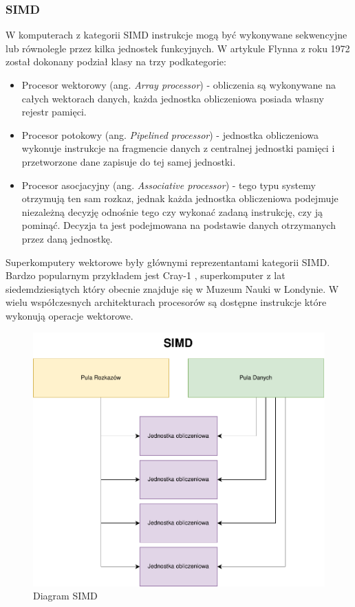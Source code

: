 \documentclass[a4paper,12pt]{book} %
\begin{document}
\subsubsection{SIMD}
W komputerach z kategorii SIMD instrukcje mogą być wykonywane sekwencyjne lub równolegle przez kilka jednostek funkcyjnych. W artykule Flynna z roku 1972 \cite{Flynn1972} został dokonany podział klasy na trzy podkategorie:
\begin{itemize}
	\item Procesor wektorowy (ang. \emph{Array processor}) - obliczenia są wykonywane na całych wektorach danych, każda jednostka obliczeniowa posiada własny rejestr pamięci.
	\item Procesor potokowy (ang. \emph{Pipelined processor}) - jednostka obliczeniowa wykonuje instrukcje na fragmencie danych z centralnej jednostki pamięci i przetworzone dane zapisuje do tej samej jednostki.
	\item Procesor asocjacyjny (ang. \emph{Associative processor}) - tego typu systemy otrzymują ten sam rozkaz, jednak każda jednostka obliczeniowa podejmuje niezależną decyzję odnośnie tego czy wykonać zadaną instrukcję, czy ją pominąć. Decyzja ta jest podejmowana na podstawie danych otrzymanych przez daną jednostkę.
\end{itemize}
Superkomputery wektorowe były głównymi reprezentantami kategorii SIMD. Bardzo popularnym przykładem jest Cray-1 \cite{Cray-1}, superkomputer z lat siedemdziesiątych który obecnie znajduje się w Muzeum Nauki w Londynie. W wielu współczesnych architekturach procesorów są dostępne instrukcje które wykonują operacje wektorowe.
\begin{figure}[h]
	\centering
	\includegraphics[scale=0.7]{assets/SIMD.pdf}
	\caption{Diagram SIMD}
	\label{SIMD}
\end{figure}
\newpage
\end{document}
